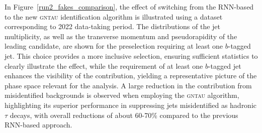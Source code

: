   In Figure~\ref{run2_fakes_comparison}, the effect of switching from the RNN-based to the new \textsc{gntau} identification algorithm is illustrated using a dataset corresponding to 2022 data-taking period.  
  The distributions of the jet multiplicity, as well as the transverse momentum and pseudorapidity of the leading \tauhad candidate, are shown for the preselection requiring at least one $b$-tagged jet.  
  This choice provides a more inclusive selection, ensuring sufficient statistics to clearly illustrate the effect, while the requirement of at least one $b$-tagged jet enhances the visibility of the \ttbar contribution, yielding a representative picture of the phase space relevant for the analysis.  
  A large reduction in the contribution from misidentified \tauhad backgrounds is observed when employing the \textsc{gntau} algorithm, highlighting its superior performance in suppressing jets misidentified as hadronic $\tau$ decays, with overall reductions of about 60-70\% compared to the previous RNN-based approach.
  

